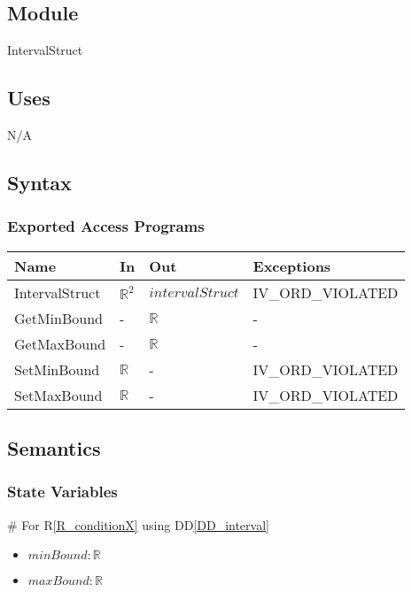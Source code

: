 \documentclass[12pt, titlepage]{article}
\newcommand{\rref}[1]{R\ref{#1}}
\newcommand{\ddref}[1]{DD\ref{#1}}
\begin{document}
\subsection{Module}

IntervalStruct

\subsection{Uses}

N/A

\subsection{Syntax}

\subsubsection{Exported Access Programs}

\begin{center}
	\begin{tabular}{p{3cm} p{3cm} p{3cm} p{5cm}}
		\hline
		\textbf{Name} & \textbf{In} & \textbf{Out} & \textbf{Exceptions} \\
		\hline		
		IntervalStruct & $\mathbb{R}^2$ & $intervalStruct$ & IV\_ORD\_VIOLATED 
		\\
		GetMinBound & - & $\mathbb{R}$ & - \\
		GetMaxBound & - & $\mathbb{R}$ & - \\
		SetMinBound & $\mathbb{R}$ & - & IV\_ORD\_VIOLATED \\
		SetMaxBound & $\mathbb{R}$ & - & IV\_ORD\_VIOLATED \\
		\hline
	\end{tabular}
\end{center}

\subsection{Semantics}

\subsubsection{State Variables}

\# For \rref{R_conditionX} using \ddref{DD_interval}
\begin{itemize}
	\item $minBound : \mathbb{R}$
	\item $maxBound : \mathbb{R}$
\end{itemize}
\end{document}
